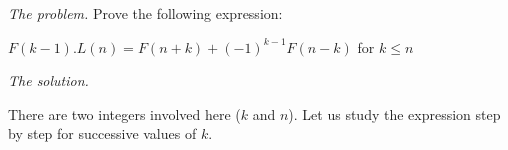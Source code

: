 %
%
%
%
%

\noindent \textit{The problem.}
Prove the following expression:

$F(k-1).L(n) = F(n+k)+ (-1)^{k-1}F(n-k)$ for $k \leq n$
\bigskip

\noindent \textit{The solution.} 

There are two integers involved here ($k$ and $n$).
Let us study the expression step by step for successive values of $k$.
\medskip


